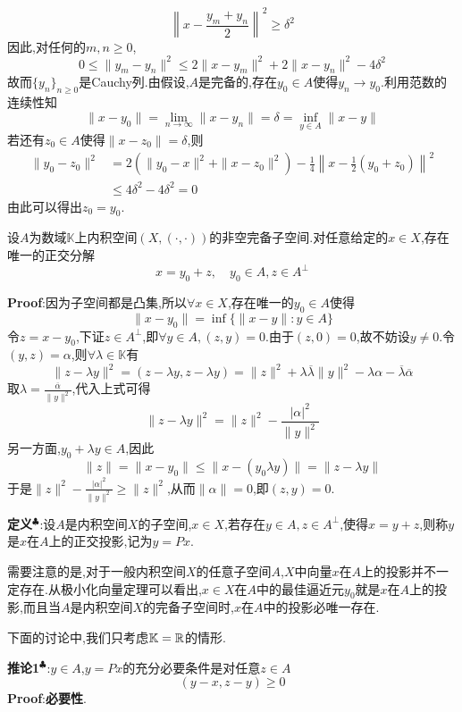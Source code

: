 $$
\left\|x-\frac{y_m+y_n}{2}\right\|^2\geqslant \delta ^2
$$
因此,对任何的$m,n\geqslant 0$,
$$
0\leqslant \|y_m-y_n\|^2\leqslant 2\|x-y_m\|^2+2\|x-y_n\|^2-4\delta ^2
$$
故而$\{y_n\}_{n\geqslant 0}$是Cauchy列.由假设,$A$是完备的,存在$y_0\in A$使得$y_n\to y_0$.利用范数的连续性知
$$
\|x-y_0\|=\lim_{n\to\infty}\|x-y_n\|=\delta=\inf_{y\in A}\|x-y\|
$$
若还有$z_0\in A$使得$\|x-z_0\|=\delta$,则
$$
\begin{aligned}
    \|y_0-z_0\|^2 &= 2\left(\|y_0-x\|^2+\|x-z_0\|^2\right)-\frac{1}{4}\left\|x-\frac{1}{2}(y_0+z_0)\right\|^2\\
                  &\leqslant 4\delta^2-4\delta^2=0
\end{aligned}
$$
由此可以得出$z_0=y_0$.\par
\begin{tcolorbox}[colback=KuangNei,colframe=BianKuang,title=\textbf{正交分解定理},sharpish corners]
    设$A$为数域$\mathbb{K}$上内积空间$(X,(\cdot,\cdot))$的非空完备子空间.对任意给定的$x\in X$,存在唯一的正交分解
    $$
    x=y_0+z,\quad y_0\in A,z\in A^{\perp }
    $$
\end{tcolorbox}
\textbf{Proof}:因为子空间都是凸集,所以$\forall x\in X$,存在唯一的$y_0\in A$使得
$$
\|x-y_0\|=\inf\{\|x-y\|:y\in A\}
$$
令$z=x-y_0$,下证$z\in A^{\perp }$,即$\forall y\in A,(z,y)=0$.由于$(z,0)=0$,故不妨设$y\neq 0$.令$(y,z)=\alpha$,则$\forall \lambda\in\mathbb{K}$有
$$
\|z-\lambda y\|^2=(z-\lambda y,z-\lambda y)=\|z\|^2+\lambda\overline{\lambda}\|y\|^2-\lambda\alpha-\overline{\lambda}\overline{\alpha}
$$
取$\lambda=\frac{\overline{\alpha}}{\|y\|^2}$,代入上式可得
$$
\|z-\lambda y\|^2=\|z\|^2-\frac{|\alpha|^2}{\|y\|^2}
$$
另一方面,$y_0+\lambda y\in A$,因此
$$
\|z\|=\|x-y_0\|\leqslant \|x-(y_0\lambda y)\|=\|z-\lambda y\|
$$
于是$\|z\|^2-\frac{|\alpha|^2}{\|y\|^2}\geqslant \|z\|^2$,从而$\|\alpha\|=0$,即$(z,y)=0$.\par
\textbf{定义}$^\clubsuit $:设$A$是内积空间$X$的子空间,$x\in X$,若存在$y\in A,z\in A^{\perp }$,使得$x=y+z$,则称$y$是$x$在$A$上的正交投影,记为$y=Px$.\par
需要注意的是,对于一般内积空间$X$的任意子空间$A$,$X$中向量$x$在$A$上的投影并不一定存在.从极小化向量定理可以看出,$x\in X$在$A$中的最佳逼近元$y_0$就是$x$在$A$上的投影,而且当$A$是内积空间$X$的完备子空间时,$x$在$A$中的投影必唯一存在.\par
下面的讨论中,我们只考虑$\mathbb{K}=\mathbb{R}$的情形.\par
\textbf{推论1}$^\clubsuit $:$y\in A$,$y=Px$的充分必要条件是对任意$z\in A$
$$
(y-x,z-y)\geqslant 0
$$
\qquad\textbf{Proof}:\textbf{必要性}.\par
